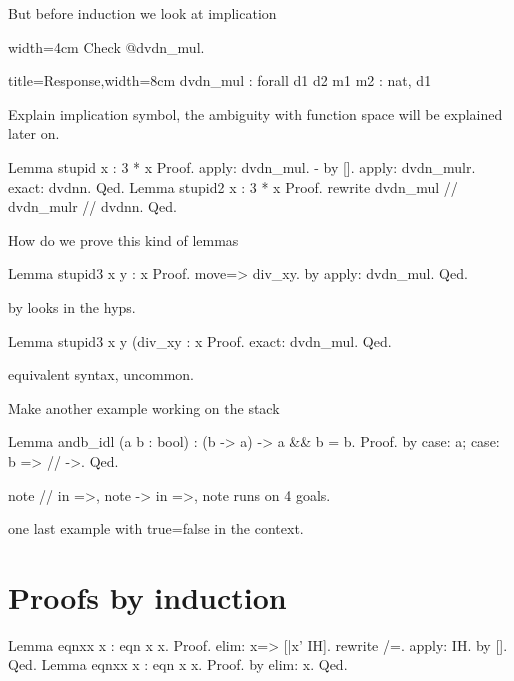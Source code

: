 But before induction we look at implication

\mcbREQUIRE{}

\begin{coq}{width=4cm}
Check @dvdn_mul.
\end{coq}
\begin{coqout}{title=Response,width=8cm}
dvdn_mul : forall d1 d2 m1 m2 : nat,
  d1 %
\end{coqout}

Explain implication symbol, the ambiguity with function space will
be explained later on.

\begin{coq}{}
Lemma stupid x : 3 * x %
Proof.
apply: dvdn_mul.
- by [].
apply: dvdn_mulr.
exact: dvdnn.
Qed.
Lemma stupid2 x : 3 * x %
Proof.
rewrite dvdn_mul // dvdn_mulr // dvdnn.
Qed.
\end{coq}

How do we prove this kind of lemmas

\begin{coq}{}
Lemma stupid3 x y : x %
Proof.
move=> div_xy.
by apply: dvdn_mul.
Qed.
\end{coq}

by looks in the hyps.

\begin{coq}{}
Lemma stupid3 x y (div_xy : x %
Proof. exact: dvdn_mul. Qed.
\end{coq}

equivalent syntax, uncommon.

Make another example working on the stack

\begin{coq}{}
Lemma andb_idl (a b : bool) : (b -> a) -> a && b = b.
Proof. by case: a; case: b => // ->. Qed.
\end{coq}

note // in =>, note -> in =>, note runs on 4 goals.

one last example with true=false in the context.

\section{Proofs by induction}

\begin{coq}{}
Lemma eqnxx x : eqn x x.
Proof.
elim: x=> [|x' IH].
rewrite /=.
apply: IH.
by [].
Qed.
Lemma eqnxx x : eqn x x.
Proof. by elim: x. Qed.
\end{coq}

